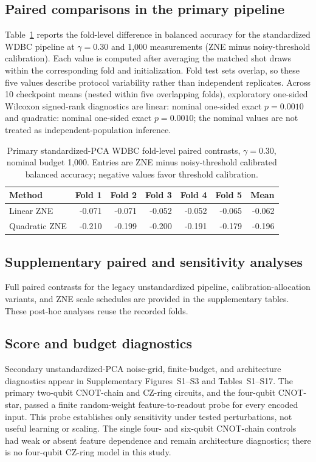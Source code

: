 \documentclass[conference]{IEEEtran}
\begin{document}
\subsection{Paired comparisons in the primary pipeline}
Table~\ref{tab:primary-paired} reports the fold-level difference in balanced accuracy for the standardized WDBC pipeline at $\gamma=0.30$ and 1,000 measurements (ZNE minus noisy-threshold calibration). Each value is computed after averaging the matched shot draws within the corresponding fold and initialization. Fold test sets overlap, so these five values describe protocol variability rather than independent replicates. Across 10 checkpoint means (nested within five overlapping folds), exploratory one-sided Wilcoxon signed-rank diagnostics are linear: nominal one-sided exact $p=0.0010$ and quadratic: nominal one-sided exact $p=0.0010$; the nominal values are not treated as independent-population inference.
\begin{table}[t]\centering\small
\caption{Primary standardized-PCA WDBC fold-level paired contrasts, $\gamma=0.30$, nominal budget 1,000. Entries are ZNE minus noisy-threshold calibrated balanced accuracy; negative values favor threshold calibration.}
\label{tab:primary-paired}
\begin{tabular}{@{}l r r r r r r@{}}\toprule
Method & Fold 1 & Fold 2 & Fold 3 & Fold 4 & Fold 5 & Mean \\
\midrule
Linear ZNE & -0.071 & -0.071 & -0.052 & -0.052 & -0.065 & -0.062 \\
Quadratic ZNE & -0.210 & -0.199 & -0.200 & -0.191 & -0.179 & -0.196 \\
\bottomrule\end{tabular}\end{table}
\subsection{Supplementary paired and sensitivity analyses}
Full paired contrasts for the legacy unstandardized pipeline, calibration-allocation variants, and ZNE scale schedules are provided in the supplementary tables. These post-hoc analyses reuse the recorded folds.

\subsection{Score and budget diagnostics}
Secondary unstandardized-PCA noise-grid, finite-budget, and architecture diagnostics appear in Supplementary Figures~S1--S3 and Tables~S1--S17. The primary two-qubit CNOT-chain and CZ-ring circuits, and the four-qubit CNOT-star, passed a finite random-weight feature-to-readout probe for every encoded input. This probe establishes only sensitivity under tested perturbations, not useful learning or scaling. The single four- and six-qubit CNOT-chain controls had weak or absent feature dependence and remain architecture diagnostics; there is no four-qubit CZ-ring model in this study.
\end{document}
